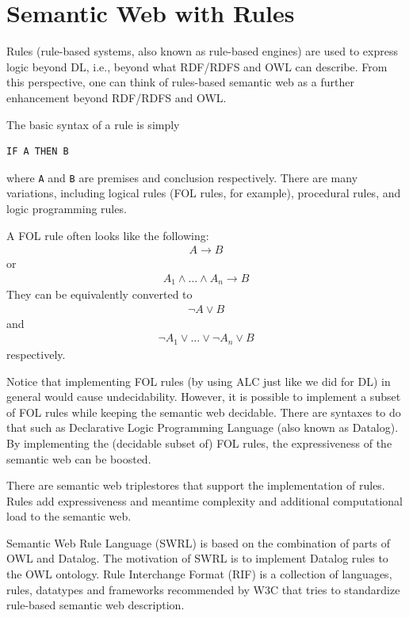 \section{Semantic Web with Rules}

Rules (rule-based systems, also known as rule-based engines) are used to express logic beyond DL, i.e., beyond what RDF/RDFS and OWL can describe. From this perspective, one can think of rules-based semantic web as a further enhancement beyond RDF/RDFS and OWL.

The basic syntax of a rule is simply
\begin{lstlisting}
IF A THEN B
\end{lstlisting}
where \verb|A| and \verb|B| are premises and conclusion respectively. There are many variations, including logical rules (FOL rules, for example), procedural rules, and logic programming rules.

A FOL rule often looks like the following:
\begin{eqnarray}
	A \rightarrow B \nonumber
\end{eqnarray}
or
\begin{eqnarray}
	A_1 \land \ldots \land A_n \rightarrow B \nonumber
\end{eqnarray}
They can be equivalently converted to
\begin{eqnarray}
	\neg A \lor B \nonumber
\end{eqnarray}
and
\begin{eqnarray}
	\neg A_1 \lor \ldots \lor \neg A_n \lor B \nonumber
\end{eqnarray}
respectively. 

Notice that implementing FOL rules (by using ALC just like we did for DL) in general would cause undecidability. However, it is possible to implement a subset of FOL rules while keeping the semantic web decidable. There are syntaxes to do that such as Declarative Logic Programming Language (also known as Datalog). By implementing the (decidable subset of) FOL rules, the expressiveness of the semantic web can be boosted.

There are semantic web triplestores that support the implementation of rules. Rules add expressiveness and meantime complexity and additional computational load to the semantic web.

Semantic Web Rule Language (SWRL) is based on the combination of parts of OWL and Datalog. The motivation of SWRL is to implement Datalog rules to the OWL ontology. Rule Interchange Format (RIF) is a collection of languages, rules, datatypes and frameworks recommended by W3C that tries to standardize rule-based semantic web description. 

